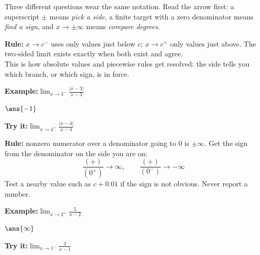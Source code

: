 \documentclass[12pt]{article}
\begin{document}

\noindent\small Three different questions wear the same notation. Read the
arrow first: a superscript $\pm$ means \emph{pick a side}, a finite target with
a zero denominator means \emph{find a sign}, and $x \to \pm\infty$ means
\emph{compare degrees}.
\normalsize

\begin{formulabox}
\textbf{Rule:} $x \to c^{-}$ uses only values just below $c$; $x \to c^{+}$
only values just above. The two-sided limit exists exactly when both exist and
agree.\\[3pt]
This is how absolute values and piecewise rules get resolved: the side tells
you which branch, or which sign, is in force.
\end{formulabox}
\begin{examplebox}
\textbf{Example:}\quad $\displaystyle \lim_{x \to 3^{-}} \frac{|x-3|}{x-3}$
\par
$\ans{-1}$
\end{examplebox}
\begin{tryitbox}
\textbf{Try it:}\quad $\displaystyle \lim_{x \to 4^{+}} \frac{|x-4|}{x-4}$
\\[2pt]
\end{tryitbox}

\begin{formulabox}
\textbf{Rule:} nonzero numerator over a denominator going to $0$ is
$\pm\infty$. Get the sign from the denominator on the side you are on:
\[ \frac{(+)}{(0^{+})} \to \infty, \qquad \frac{(+)}{(0^{-})} \to -\infty \]
Test a nearby value such as $c + 0.01$ if the sign is not obvious. Never
report a number.
\end{formulabox}
\begin{examplebox}
\textbf{Example:}\quad $\displaystyle \lim_{x \to 2^{+}} \frac{5}{x-2}$
\par
$\ans{\infty}$
\end{examplebox}
\begin{tryitbox}
\textbf{Try it:}\quad $\displaystyle \lim_{x \to 1^{-}} \frac{3}{x-1}$\\[2pt]
\end{tryitbox}
\end{document}
